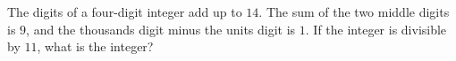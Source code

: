 The digits of a four-digit integer add up to $14$. The sum of the two middle digits is $9$, and the thousands digit minus the units digit is $1$. If the integer is divisible by $11$, what is the integer?
